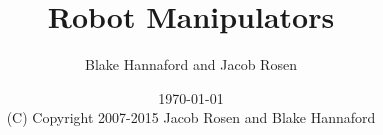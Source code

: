\documentclass[oneside]{book}
\begin{document}
\setpagewiselinenumbers
\modulolinenumbers[5]

\setcounter{chapter}{0}



 \title{Robot Manipulators}

 \author{Blake Hannaford and Jacob Rosen}

 \date{\today\\(C) Copyright 2007-2015 Jacob Rosen and Blake Hannaford}

 \maketitle

\tableofcontents

\mainmatter

\linenumbers


%
%
% 
% 
%  
% 
% 
% 

\appendix



%
\label{LastPage}
\end{document}
